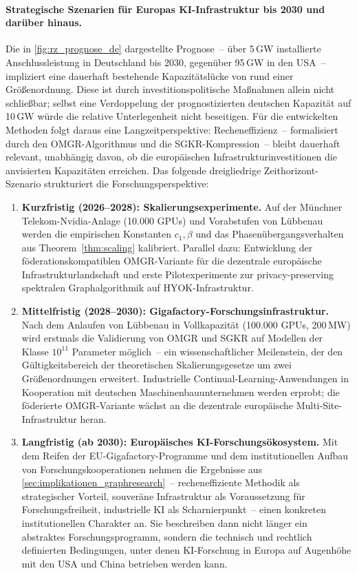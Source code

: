 \documentclass[12pt, a4paper, openany]{report}
\begin{document}
\paragraph{Strategische Szenarien für Europas KI-Infrastruktur bis 2030
  und darüber hinaus.}
Die in \cref{fig:rz_prognose_de} dargestellte Prognose~-- über 5\,GW
installierte Anschlussleistung in Deutschland bis 2030, gegenüber
95\,GW in den USA~-- impliziert eine dauerhaft bestehende
Kapazitätslücke von rund einer Größenordnung.  Diese ist durch
investitionspolitische Maßnahmen allein nicht schließbar; selbst eine
Verdoppelung der prognostizierten deutschen Kapazität auf 10\,GW würde
die relative Unterlegenheit nicht beseitigen.  Für die entwickelten
Methoden folgt daraus eine Langzeitperspektive: Recheneffizienz~--
formalisiert durch den OMGR-Algorithmus und die SGKR-Kompression~--
bleibt dauerhaft relevant, unabhängig davon, ob die europäischen
Infrastrukturinvestitionen die anvisierten Kapazitäten erreichen.
Das folgende dreigliedrige Zeithorizont-Szenario strukturiert die
Forschungsperspektive:
\begin{enumerate}[label=(\alph*)]
  \item \textbf{Kurzfristig (2026--2028): Skalierungsexperimente.}
    Auf der Münchner Telekom-Nvidia-Anlage (10.000 GPUs) und
    Vorabstufen von Lübbenau werden die empirischen Konstanten
    $c_1, \beta$ und das Phasenübergangsverhalten aus
    Theorem~\ref{thm:scaling} kalibriert.  Parallel dazu: Entwicklung
    der föderationskompatiblen OMGR-Variante für die dezentrale
    europäische Infrastrukturlandschaft und erste Pilotexperimente zur
    privacy-preserving spektralen Graphalgorithmik auf
    HYOK-Infrastruktur.
  \item \textbf{Mittelfristig (2028--2030): Gigafactory-Forschungsinfrastruktur.}
    Nach dem Anlaufen von Lübbenau in Vollkapazität (100.000 GPUs,
    200\,MW) wird erstmals die Validierung von OMGR und SGKR auf
    Modellen der Klasse $10^{11}$ Parameter möglich~-- ein
    wissenschaftlicher Meilenstein, der den Gültigkeitsbereich der
    theoretischen Skalierungsgesetze um zwei Größenordnungen erweitert.
    Industrielle Continual-Learning-Anwendungen in Kooperation mit
    deutschen Maschinenbauunternehmen werden erprobt; die föderierte
    OMGR-Variante wächst an die dezentrale europäische
    Multi-Site-Infrastruktur heran.
  \item \textbf{Langfristig (ab 2030): Europäisches KI-Forschungsökosystem.}
    Mit dem Reifen der EU-Gigafactory-Programme und dem institutionellen
    Aufbau von Forschungskooperationen nehmen die Ergebnisse aus
    \cref{sec:implikationen_graphresearch}~-- recheneffiziente Methodik
    als strategischer Vorteil, souveräne Infrastruktur als Voraussetzung
    für Forschungsfreiheit, industrielle KI als
    Scharnierpunkt~-- einen konkreten institutionellen Charakter an.
    Sie beschreiben dann nicht länger ein abstraktes Forschungsprogramm,
    sondern die technisch und rechtlich definierten Bedingungen, unter
    denen KI-Forschung in Europa auf Augenhöhe mit den USA und China
    betrieben werden kann.
\end{enumerate}
\end{document}
